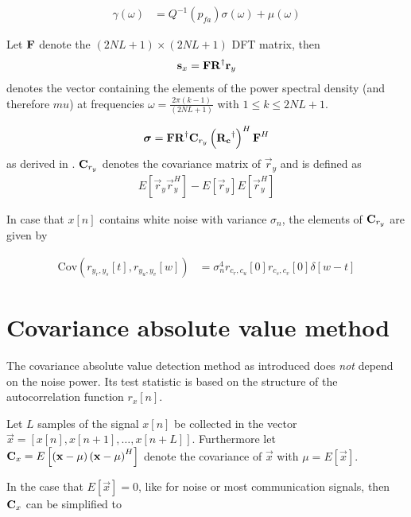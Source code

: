 \documentclass[a4paper, openany, oneside]{memoir}
\begin{document}
\begin{align*}
\gamma(\omega) &= Q^{-1}(p_{fa})\sigma (\omega) + \mu (\omega) 
\end{align*}
 
 Let $\boldsymbol{\mathbf{F}}$ denote the $(2NL+1) \times (2NL+1) $ DFT matrix, then
\begin{align*}
\boldsymbol{\mathbf{s}}_x = \boldsymbol{\mathbf{F}}\boldsymbol{\mathbf{R}}^{\dagger}\boldsymbol{\mathbf{r}}_y
\end{align*}
denotes the vector containing the elements of the power spectral density (and therefore $mu$) at frequencies $\omega = \frac{2\pi (k-1)}{(2NL+1)}$ with $1\leq k \leq 2NL+1$. 

\begin{align*}
\boldsymbol{\mathbf{\sigma}} = \boldsymbol{\mathbf{F}}\boldsymbol{\mathbf{R}}^{\dagger}\boldsymbol{\mathbf{C}}_{r_y} \left(\boldsymbol{\mathbf{R_c}}^{\dagger}\right)^{H}\boldsymbol{\mathbf{F}}^H
\end{align*}
as derived in \cite{ariananda2012compressive}. $\boldsymbol{\mathbf{C}}_{r_y}$ denotes the covariance matrix of $\vec{r}_y$ and is defined as
\begin{align*}
 E\left[\vec{r}_y\vec{r}_y^H\right] - E\left[\vec{r}_y\right]E\left[\vec{r}_y^H\right]
\end{align*}

In case that $x[n]$ contains white noise with variance $\sigma_n$, the elements of $\boldsymbol{\mathbf{C}}_{r_y}$ are given by

\begin{align*}
\text{Cov}\left(r_{y_r,y_s}[t],r_{y_u,y_v}[w]\right) &= \sigma_n^4 r_{c_r,c_u}[0]r_{c_s,c_v}[0]\delta[w-t]
\end{align*}

\section{Covariance absolute value method}
The covariance absolute value detection method as introduced does \emph{not} depend on the noise power. Its test statistic is based on the structure of the autocorrelation function $r_x[n]$.

Let $L$ samples of the signal $x[n]$ be collected in the vector $\vec{x} = \left[x[n], x[n+1], \ldots, x[n+L]\right]$. 
Furthermore let $\boldsymbol{\mathbf{C}}_x = E\left[\left(\boldsymbol{\mathbf{x}} - \mu \right)\left(\boldsymbol{\mathbf{x}} - \mu \right)^H\right]$ denote the covariance of $\vec{x}$ with $\mu = E[\vec{x}]$.

In the case that $E\left[\vec{x}\right]=0$, like for noise or most communication signals, then $\boldsymbol{\mathbf{C}}_x$ can be simplified to
\end{document}
